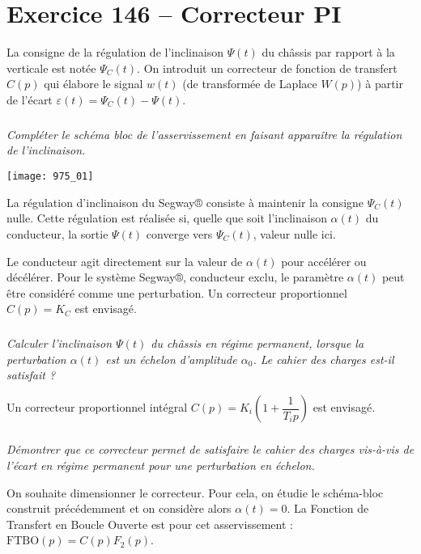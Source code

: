 \section*{Exercice 146 -- Correcteur PI}
\setcounter{exo}{0}



La consigne de la régulation de l’inclinaison $\Psi(t)$ du châssis par rapport à la verticale
est notée $\Psi_C(t)$. On introduit un correcteur de fonction de transfert $C(p)$
qui élabore le signal $w(t)$ (de transformée de Laplace $W(p)$) à partir de l’écart
$\varepsilon(t)=\Psi_C(t)-\Psi(t)$.


\subparagraph{}
\textit{Compléter le schéma bloc de l’asservissement en faisant apparaître la régulation de l’inclinaison. }
\ifprof
\begin{corrige}
\end{corrige}
\else
\fi


\begin{center}
\texttt{[image: 975\_01]}%
\end{center}


La régulation d’inclinaison du Segway® consiste à maintenir la consigne $\Psi_C(t)$
nulle. Cette régulation est réalisée si, quelle que soit l’inclinaison $\alpha(t)$
du conducteur, la sortie $\Psi(t)$ converge vers $\Psi_C(t)$, valeur nulle ici.

Le conducteur agit directement sur la valeur de $\alpha(t)$ pour accélérer ou décélérer.
Pour le système Segway®, conducteur exclu, le paramètre $\alpha(t)$  peut être considéré
comme une perturbation.
Un correcteur proportionnel $C(p)=K_C$ est envisagé.


\subparagraph{}
\textit{Calculer l’inclinaison $\Psi(t)$ du châssis en régime permanent, lorsque la
perturbation  $\alpha(t)$ est un échelon d’amplitude $\alpha_0$. Le cahier des charges est-il
satisfait ?}
\ifprof
\begin{corrige}
\end{corrige}
\else
\fi

Un correcteur proportionnel intégral $C(p)=K_i\left( 1 +\dfrac{1}{T_i p} \right)$ est envisagé.

\subparagraph{}
\textit{Démontrer que ce correcteur permet de satisfaire le cahier des charges vis-à-vis de l’écart en régime permanent pour une perturbation en échelon.}
\ifprof
\begin{corrige}
\end{corrige}
\else
\fi

On souhaite dimensionner le correcteur. Pour cela, on étudie le schéma-bloc
construit précédemment et on considère alors $\alpha(t)=0$. La Fonction de Transfert en
Boucle Ouverte est pour cet asservissement : $\text{FTBO}(p)=C(p)F_2(p)$.




